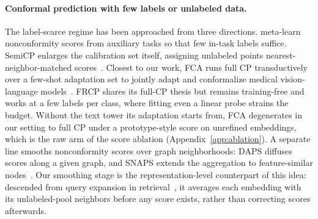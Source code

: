 \paragraph{Conformal prediction with few labels or unlabeled data.}
The label-scarce regime has been approached from three directions.
\citet{fisch2021few} meta-learn nonconformity scores from auxiliary
tasks so that few in-task labels suffice. SemiCP enlarges the
calibration set itself, assigning unlabeled points
nearest-neighbor-matched scores~\citep{zhou2026semicp}. Closest to our
work, FCA runs full CP transductively over a few-shot adaptation set to
jointly adapt and conformalize medical vision-language
models~\citep{silva2025full}. FRCP shares its full-CP thesis but remains training-free and works at
a few labels per class, where fitting even a linear probe strains the
budget. Without the text tower its adaptation starts from, FCA
degenerates in our setting to full CP under a prototype-style score on
unrefined embeddings, which is the raw arm of the score ablation
(Appendix~\ref{app:ablation}). A separate line smooths
nonconformity scores over graph neighborhoods: DAPS diffuses scores
along a given graph, and SNAPS extends the aggregation to
feature-similar nodes~\citep{zargarbashi2023conformal,
song2024similarity}. Our smoothing stage is the representation-level
counterpart of this idea: descended from query expansion in
retrieval~\citep{radenovic2019finetuning}, it averages each embedding
with its unlabeled-pool neighbors before any score exists, rather than
correcting scores afterwards.
